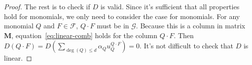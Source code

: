 \documentclass{article}
\begin{document}
\begin{Proof}
\begin{proof}
The rest is to check if $D$ is valid. Since it's sufficient that all
properties hold for monomials, we only need to consider the case for
monomials. For any monomial $Q$ and $F \in \mathcal{F}$, $Q\cdot F$
must be in $\mathcal{G}$. Because this is a column in matrix
$\mathbf{M}$, equation~\eqref{eq:linear-comb} holds for the column
$Q\cdot F$. Then $D(Q\cdot F) = D(\sum_{\deg(Q) \leq d}\alpha_Q
u_{Q}^{Q\cdot F}) = 0$. It's not difficult to check that $D$ is
linear.
  \end{proof}
\end{Proof}


\ifx\allfiles\undefined
  
\end{document}
